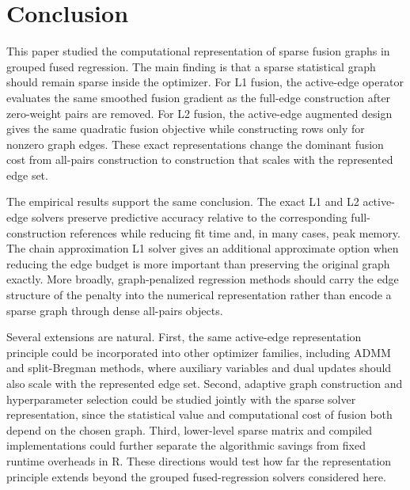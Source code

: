 \documentclass[twoside,11pt]{article}
\begin{document}
\section{Conclusion}

This paper studied the computational representation of sparse fusion graphs in
grouped fused regression. The main finding is that a sparse statistical graph
should remain sparse inside the optimizer. For L1 fusion, the active-edge
operator evaluates the same smoothed fusion gradient as the full-edge
construction after zero-weight pairs are removed. For L2 fusion, the
active-edge augmented design gives the same quadratic fusion objective while
constructing rows only for nonzero graph edges. These exact representations
change the dominant fusion cost from all-pairs construction to construction
that scales with the represented edge set.

The empirical results support the same conclusion. The exact L1 and L2
active-edge solvers preserve predictive accuracy relative to the corresponding
full-construction references while reducing fit time and, in many cases, peak
memory. The chain approximation L1 solver gives an additional approximate option
when reducing the edge budget is more important than preserving the original
graph exactly. More broadly, graph-penalized regression methods should carry
the edge structure of the penalty into the numerical representation rather
than encode a sparse graph through dense all-pairs objects.

Several extensions are natural. First, the same active-edge representation
principle could be incorporated into other optimizer families, including ADMM
and split-Bregman methods, where auxiliary variables and dual updates should
also scale with the represented edge set. Second, adaptive graph construction
and hyperparameter selection could be studied jointly with the sparse solver
representation, since the statistical value and computational cost of fusion
both depend on the chosen graph. Third, lower-level sparse matrix and compiled
implementations could further separate the algorithmic savings from fixed
runtime overheads in R. These directions would test how far the representation
principle extends beyond the grouped fused-regression solvers considered here.



\end{document}
